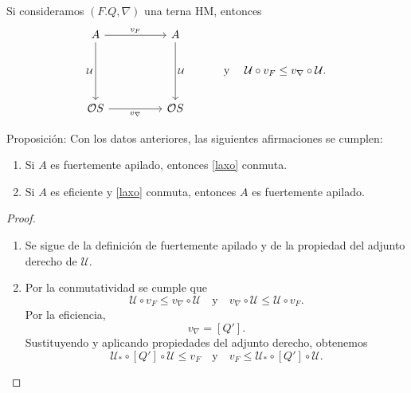 \documentclass[compress,12pt]{beamer}
\begin{document}
\begin{frame}[fragile]
  Si consideramos $(F. Q, \nabla)$ una terna HM, entonces
  \begin{equation}\label{laxo}
  \begin{tikzcd}
	A && A & \\
	&&& {\text{ y }\quad\mathcal{U}\circ v_F\leq v_\nabla\circ \mathcal{U}.} \\
	{\mathcal{O}S} && {\mathcal{O}S}
	\arrow["{v_F}", from=1-1, to=1-3]
	\arrow["{\mathcal{U}}"', from=1-1, to=3-1]
	\arrow["{\mathcal{U}}", from=1-3, to=3-3]
	\arrow["{v_\nabla}"', from=3-1, to=3-3]
\end{tikzcd}\end{equation}


\begin{block}{Proposición:}
Con los datos anteriores, las siguientes afirmaciones se cumplen:
\begin{enumerate}
  \item Si $A$ es fuertemente apilado, entonces \eqref{laxo} conmuta.
  \item Si $A$ es eficiente y \eqref{laxo} conmuta, entonces $A$ es fuertemente apilado.
\end{enumerate}
\end{block}
\end{frame}

\begin{frame}
\begin{proof}
\begin{enumerate}
\item Se sigue de la definición de fuertemente apilado y de la propiedad del adjunto derecho de $\mathcal{U}$.
\item Por la conmutatividad se cumple que
\[
\mathcal{U}\circ v_F\leq v_\nabla\circ \mathcal{U}\quad\text{y}\quad v_\nabla\circ \mathcal{U}\leq \mathcal{U}\circ v_F.
\]
Por la eficiencia,
\[
v_\nabla=[Q'].
\]
Sustituyendo y aplicando propiedades del adjunto derecho, obtenemos
\[
\mathcal{U}_*\circ [Q']\circ \mathcal{U}\leq v_F\quad\text{y}\quad v_F\leq \mathcal{U}_*\circ [Q']\circ \mathcal{U}.
\]
\end{enumerate}
\end{proof}
\end{frame}
\end{document}
